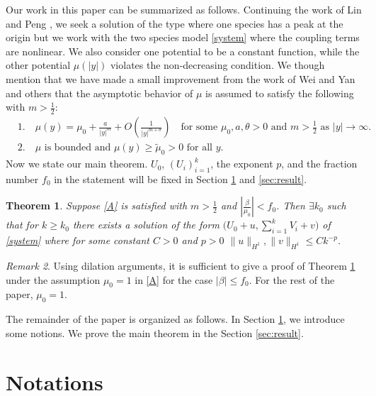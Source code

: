 \documentclass{amsart}
\newtheorem{theorem}{Theorem}[section]
\theoremstyle{definition}
\theoremstyle{remark}
\newtheorem{remark}[theorem]{Remark}
\numberwithin{equation}{section}
\begin{document}
Our work in this paper can be summarized as follows. Continuing the work of Lin and Peng  \cite{lin_peng_2014}, we seek a solution of the type where one species has a peak at the origin but we work with the two species model \eqref{system} where the coupling terms are nonlinear. We also consider one potential to be a constant function, while the other potential $\mu(|y|)$ violates the non-decreasing condition. We though mention that we have made a small improvement from the work of Wei and Yan \cite{wei_yan_2014} and others that the asymptotic behavior of $\mu$ is assumed to satisfy the following with $m> \frac{1}{2}$:
\begin{equation}\tag{$A$}\label{A}
 \begin{aligned}
  &1. \quad \mu(y) = \mu_0 + \frac{a}{|y|^m} + O\left(\frac{1}{|y|^{m+\theta}}\right) \quad \text{for some $\mu_0,a,\theta>0$ and $m> \frac{1}{2}$ as $|y| \rightarrow \infty$.}\\
  &2. \quad \text{$\mu$ is bounded and $\mu(y)\ge \tilde{\mu}_0 > 0$ for all $y$.}
 \end{aligned}
\end{equation}
Now we state our main theorem. $U_0$, $(U_i)_{i=1}^k$, the exponent $p$, and the fraction number $f_0$ in the statement will be fixed in Section \ref{notions} and \ref{sec:result}.
\begin{theorem} \label{mainthm} Suppose \eqref{A} is satisfied with $m > \frac{1}{2}$ and $\left|\frac{\beta}{\mu_0}\right| < f_0$. Then $\exists k_0$ such that for $k\ge k_0$ there exists a solution of the form $\Big(U_0 +u, \displaystyle \sum_{i=1}^k V_i + v\Big)$ of \eqref{system} where for some constant $C>0$ and $p> 0$ $ \|u\|_{H^1},  \|v\|_{H^1} \le Ck^{-p}$.
\end{theorem}
\begin{remark}
  Using dilation arguments, it is sufficient to give a proof of Theorem \ref{mainthm} under the assumption $\mu_0=1$ in \eqref{A} for the  case $|\beta| \le f_0$. For the rest of the paper, $\mu_0=1$.
\end{remark}
The remainder of the paper is organized as follows. In Section \ref{notions}, we introduce some notions. We prove the main theorem in the Section \ref{sec:result}.

\section{Notations} \label{notions}
\end{document}
